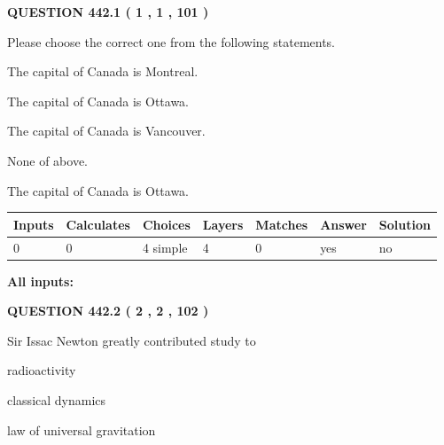 \documentclass[12pt]{article}
\begin{document}
{\textbf{\Large{QUESTION
442.1 
 ( 1 , 1 , 101 )
}}}
  
  
Please choose the correct one from the following statements.
 
 
The capital of Canada is Montreal.
 
 
The capital of Canada is Ottawa.
 
 
The capital of Canada is Vancouver.
 
 
 None of above.
 
 
\noindent{}
 
 
The capital of Canada is Ottawa.
 
 
\noindent{}
 
 
   
   
   
   
\noindent\begin{tabular}{|l|l|l|l|l|l|l|}
 \hline
Inputs & Calculates & Choices & Layers & Matches & Answer & Solution \\ \hline
 0  & 
 0  & 
 4
  simple  
  & 
 4  & 
 0  & 
  yes & 
  no 
  \\ \hline
 \end{tabular}
   
   
   
   
\noindent{}
   
   
   
   
\noindent\vspace{0.1in}\hspace{-0.08in} {\textbf{\Large{All inputs: }}}
   
   
  
\vspace{0.2in}
  
{\textbf{\Large{QUESTION
442.2 
 ( 2 , 2 , 102 )
}}}
  
  
Sir Issac Newton greatly contributed study to
 
 
radioactivity
 
 
classical dynamics
 
 
law of universal gravitation
 
\end{document}
